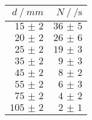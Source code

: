 \begin{tabular}{rr}
	\toprule
	$d ~/~ \si{mm}$ & $N ~/~ \si{\per\second}$\\
	\midrule
	$\num{15(2)}$ & $\num{36(5)}$ \\
	$\num{20(2)}$ & $\num{26(6)}$ \\
	$\num{25(2)}$ & $\num{19(3)}$ \\
	$\num{35(2)}$ & $\num{9(3)}$ \\
	$\num{45(2)}$ & $\num{8(2)}$ \\
	$\num{55(2)}$ & $\num{6(3)}$ \\
	$\num{75(2)}$ & $\num{4(2)}$ \\
	$\num{105(2)}$ & $\num{2(1)}$ \\
	\bottomrule
\end{tabular}
